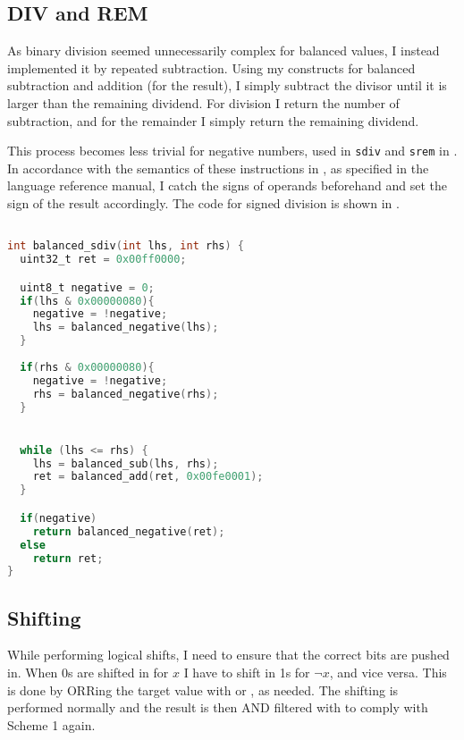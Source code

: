 \subsection{DIV and REM}
As binary division seemed unnecessarily complex for balanced values, I instead implemented it by repeated subtraction.
Using my constructs for balanced subtraction and addition (for the result), I simply subtract the divisor until it is larger than the remaining dividend.
For division I return the number of subtraction, and for the remainder I simply return the remaining dividend.

This process becomes less trivial for negative numbers, used in \texttt{sdiv} and \texttt{srem} in \ir{}.
In accordance with the semantics of these instructions in \ir{}, as specified in the \llvm{} language reference manual\cite{lattner2006llvm}, I catch the signs of operands beforehand and set the sign of the result accordingly.
The code for signed division is shown in .

\begin{lstlisting}[language=C, caption=Balanced signed division, label=lst:sdiv]

int balanced_sdiv(int lhs, int rhs) {
  uint32_t ret = 0x00ff0000;

  uint8_t negative = 0;
  if(lhs & 0x00000080){
    negative = !negative;
    lhs = balanced_negative(lhs);
  }
  
  if(rhs & 0x00000080){
    negative = !negative;
    rhs = balanced_negative(rhs);
  }


  while (lhs <= rhs) {
    lhs = balanced_sub(lhs, rhs);
    ret = balanced_add(ret, 0x00fe0001);
  }

  if(negative)
    return balanced_negative(ret);
  else
    return ret;
}

\end{lstlisting}

\subsection{Shifting}
While performing logical shifts, I need to ensure that the correct bits are pushed in.
When 0s are shifted in for $x$ I have to shift in 1s for $\neg{x}$, and vice versa.
This is done by ORRing the target value with  or , as needed.
The shifting is performed normally and the result is then AND filtered with  to comply with Scheme 1 again.

